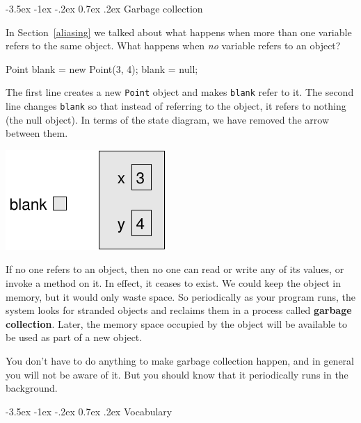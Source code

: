 \documentclass[12pt]{book}
\makeatletter
\theoremstyle{exercise}
\newcommand{\java}[1]{\verb"#1"}
\renewcommand{\section}{\@startsection {section}{1}{\z@}%
    {-3.5ex \@plus -1ex \@minus -.2ex}%
    {0.7ex \@plus.2ex}%
    {\normalfont\Large\bfseries}}
\newcommand{\java}[1]{\lstinline{#1}} %
\makeatother
\begin{document}
\section{Garbage collection}

In Section~\ref{aliasing} we talked about what happens when more than one variable refers to the same object.
What happens when {\em no} variable refers to an object?

\begin{code}
    Point blank = new Point(3, 4);
    blank = null;
\end{code}

The first line creates a new \java{Point} object and makes \java{blank} refer to it.
The second line changes \java{blank} so that instead of referring to the object, it refers to nothing (the null object).
In terms of the state diagram, we have removed the arrow between them.

\begin{center}
\includegraphics{figs/reference3.pdf}
\end{center}


If no one refers to an object, then no one can read or write any of its values, or invoke a method on it.
In effect, it ceases to exist.
We could keep the object in memory, but it would only waste space.
So periodically as your program runs, the system looks for stranded objects and reclaims them in a process called {\bf garbage collection}.
Later, the memory space occupied by the object will be available to be used as part of a new object.

You don't have to do anything to make garbage collection happen, and in general you will not be aware of it.
But you should know that it periodically runs in the background.


\section{Vocabulary}
\end{document}
